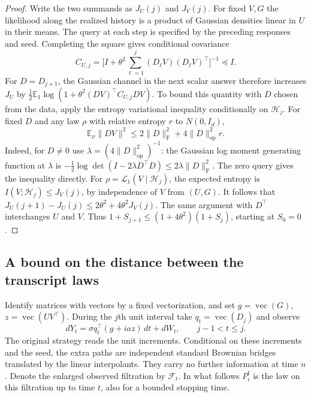 \begin{proof}
Write the two summands as \(J_U(j)\) and \(J_V(j)\).
For fixed \(V,G\) the likelihood along the realized history is a product
of Gaussian densities linear in \(U\) in their means. The query at each
step is specified by the preceding responses and seed. Completing the
square gives conditional covariance
\[
 C_{U,j}=\Big[I+\theta^2\sum_{\ell=1}^j
       (D_\ell V)(D_\ell V)^\top\Big]^{-1}\preceq I.
\]
For \(D=D_{j+1}\), the Gaussian channel in the next scalar answer therefore
increases \(J_U\) by
\(\tfrac12\mathbb E_1\log(1+\theta^2(DV)^\top C_{U,j}DV)\).
To bound this quantity with \(D\) chosen from the data, apply the entropy
variational inequality conditionally on \(\mathcal H_j\). For fixed \(D\)
and any law \(\rho\) with relative entropy \(r\) to \(N(0,I_d)\),
\[
 \mathbb E_\rho\|DV\|^2
 \le 2\|D\|_{\mathrm F}^2+4\|D\|_{\mathrm{op}}^2r.
\]
Indeed, for \(D\ne0\) use \(\lambda=(4\|D\|_{\mathrm{op}}^2)^{-1}\):
the Gaussian log moment generating function at \(\lambda\) is
\(-\tfrac12\log\det(I-2\lambda D^\top D)
 \le 2\lambda\|D\|_{\mathrm F}^2\). The zero query gives the inequality directly.
For \(\rho=\mathcal L_1(V\mid\mathcal H_j)\), the expected entropy is
\(I(V;\mathcal H_j)\le J_V(j)\), by independence of \(V\) from \((U,G)\).
It follows that
\(J_U(j+1)-J_U(j)\le2\theta^2+4\theta^2J_V(j)\).
The same argument with \(D^\top\) interchanges \(U\) and \(V\).
Thus \(1+S_{j+1}\le(1+4\theta^2)(1+S_j)\), starting at \(S_0=0\).
\end{proof}

\subsection{A bound on the distance between the transcript laws}

Identify matrices with vectors by a fixed vectorization, and set
\(g=\operatorname{vec}(G)\), \(z=\operatorname{vec}(UV^\top)\).
During the \(j\)th unit interval take \(q_t=\operatorname{vec}(D_j)\)
and observe
\[
 dY_t=\sigma q_t^\top (g+i a z)\,dt+dW_t,\qquad j-1<t\le j.
\]
The original strategy reads the unit increments. Conditional on these
increments and the seed, the extra paths are independent standard
Brownian bridges translated by the linear interpolants. They carry no
further information at time \(n\). Denote the enlarged observed
filtration by \(\mathcal F_t\). In what follows \(P_i^t\) is the law
on this filtration up to time \(t\), also for a bounded stopping time.

